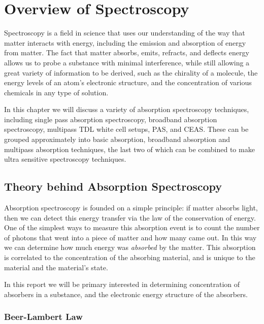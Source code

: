 \chapter{Overview of Spectroscopy}\label{ch:introduction}

Spectroscopy is a field in science that uses our understanding of the way
that matter interacts with energy, including the emission and absorption
of energy from matter. The fact that matter absorbs, emits, refracts, and
deflects energy allows us to probe a substance with minimal interference,
while still allowing a great variety of information to be derived, such as
the chirality of a molecule, the energy levels of an atom's
electronic structure, and the concentration of various chemicals in any type of solution.



In this chapter we will discuss a variety of absorption spectroscopy
techniques, including single pass absorption spectroscopy, broadband
absorption spectroscopy, multipass \ac{TDL} white cell setups, \ac{PAS},
and \ac{CEAS}. These can be grouped approximately into basic
absorption, broadband absorption and multipass absorption techniques, the last
two of which can be combined to make ultra sensitive spectroscopy techniques.


\section{Theory behind Absorption Spectroscopy}\label{sec:theory}

Absorption spectroscopy is founded on a simple principle: if matter absorbs
light, then we can detect this energy transfer via the law of the conservation
of energy. One of the simplest ways to measure this absorption event is to
count the number of photons that went into a piece of matter and how many
came out. In this way we can determine how much energy was \emph{absorbed}
by the matter. This absorption is correlated to the concentration of the
absorbing material, and is unique to the material and the material's state.

In this report we will be primary interested in determining concentration
of absorbers in a substance, and the electronic energy structure of the
absorbers.

\subsection{Beer-Lambert Law}\label{subsec:beer}

